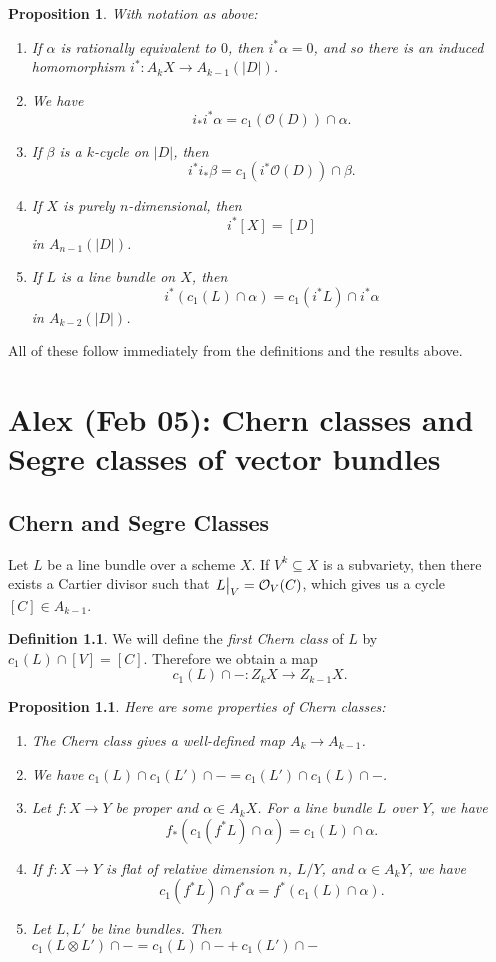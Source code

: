 \documentclass[leqno, openany]{memoir}
\newtheorem{prop}[thm]{Proposition}
\theoremstyle{definition}
\newtheorem{defn}[thm]{Definition}
\theoremstyle{remark}
\theoremstyle{plain}
\theoremstyle{definition}
\theoremstyle{remark}
\newcommand{\mc}[1]{\mathcal{#1}}
\begin{document}
\begin{prop} With notation as above: \begin{enumerate}[label=(\alph*)] \item If
    $\alpha$ is rationally equivalent to $0$, then $i^* \alpha = 0$, and so
    there is an induced homomorphism $i^*\colon A_k X \to A_{k-1} (|D|)$.
\item We have \[ i_* i^* \alpha = c_1(\mc{O}(D)) \cap \alpha . \] \item If
    $\beta$ is a $k$-cycle on $|D|$, then \[ i^* i_* \beta = c_1(i^* \mc{O}(D))
        \cap \beta . \] \item If $X$ is purely $n$-dimensional, then \[ i^* [X]
    = [D] \] in $A_{n-1} (|D|)$.  \item If $L$ is a line bundle on $X$, then \[
    i^* (c_1(L) \cap \alpha) = c_1(i^* L) \cap i^* \alpha \] in $A_{k-2}
    (|D|)$.  \end{enumerate} \end{prop} All of these follow immediately from
    the definitions and the results above.

\chapter{Alex (Feb 05): Chern classes and Segre classes of vector bundles}%
\label{cha:alex_feb_05_chern_classes_and_segre_classes_of_vector_bundles}

\section{Chern and Segre Classes}%

Let $L$ be a line bundle over a scheme $X$. If $V^k \subseteq X$ is a
subvariety, then there exists a Cartier divisor such that $\eval{L}_V =
\mc{O}_V(C)$, which gives us a cycle $[C] \in A_{k-1}$. 

\begin{defn} We will define the \textit{first Chern class} of $L$ by $c_1(L)
    \cap [V] = [C]$. Therefore we obtain a map \[ c_1(L) \cap - \colon Z_k X
    \to Z_{k-1} X. \] \end{defn}

\begin{prop} Here are some properties of Chern classes: \begin{enumerate} \item
    The Chern class gives a well-defined map $A_k \to A_{k-1}$.  \item We have
    $c_1(L) \cap c_1(L') \cap - = c_1(L') \cap c_1(L) \cap -$.  \item Let $f
    \colon X \to Y$ be proper and $\alpha \in A_k X$. For a line bundle $L$
    over $Y$, we have \[ f_* (c_1(f^* L) \cap \alpha) = c_1(L) \cap \alpha. \]
\item If $f \colon X \to Y$ is flat of relative dimension $n$, $L/Y$, and
    $\alpha \in A_k Y$, we have \[ c_1(f^* L) \cap f^* \alpha = f^*(c_1(L) \cap
    \alpha). \] \item Let $L, L'$ be line bundles. Then $c_1(L \otimes L') \cap
    - = c_1(L) \cap - + c_1(L') \cap -$ \end{enumerate} \end{prop}
\end{document}
